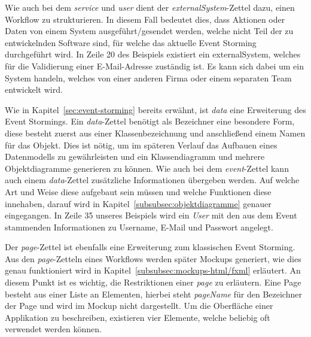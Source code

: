 
Wie auch bei dem \textit{service} und \textit{user} dient der \textit{externalSystem}-Zettel dazu, einen Workflow zu strukturieren.
In diesem Fall bedeutet dies, dass Aktionen oder Daten von einem System ausgeführt/gesendet werden, welche nicht Teil der zu entwickelnden
Software sind, für welche das aktuelle Event Storming durchgeführt wird.
In Zeile 20 des Beispiels existiert ein externalSystem, welches für die Validierung einer E-Mail-Adresse zuständig ist.
Es kann sich dabei um ein System handeln, welches von einer anderen Firma oder einem separaten Team entwickelt wird.


Wie in Kapitel~\ref{sec:event-storming} bereits erwähnt, ist \textit{data} eine Erweiterung des Event Stormings.
Ein \textit{data}-Zettel benötigt als Bezeichner eine besondere Form, diese besteht zuerst aus einer Klassenbezeichnung und anschließend einem Namen für das Objekt.
Dies ist nötig, um im späteren Verlauf das Aufbauen eines Datenmodells zu gewährleisten und ein Klassendiagramm und mehrere Objektdiagramme generieren zu können.
Wie auch bei dem \textit{event}-Zettel kann auch einem \textit{data}-Zettel zusätzliche Informationen übergeben werden.
Auf welche Art und Weise diese aufgebaut sein müssen und welche Funktionen diese innehaben, darauf wird in Kapitel~\ref{subsubsec:objektdiagramme} genauer eingegangen.
In Zeile 35 unseres Beispiels wird ein \textit{User} mit den aus dem Event stammenden Informationen zu Username, E-Mail und Passwort angelegt.


Der \textit{page}-Zettel ist ebenfalls eine Erweiterung zum klassischen Event Storming.
Aus den \textit{page}-Zetteln eines Workflows werden später Mockups generiert, wie dies genau funktioniert wird in Kapitel~\ref{subsubsec:mockups-html/fxml} erläutert.
An diesem Punkt ist es wichtig, die Restriktionen einer \textit{page} zu erläutern.
Eine Page besteht aus einer Liste an Elementen, hierbei steht \textit{pageName} für den Bezeichner der Page und wird im Mockup nicht dargestellt.
Um die Oberfläche einer Applikation zu beschreiben, existieren vier Elemente, welche beliebig oft verwendet werden können.

